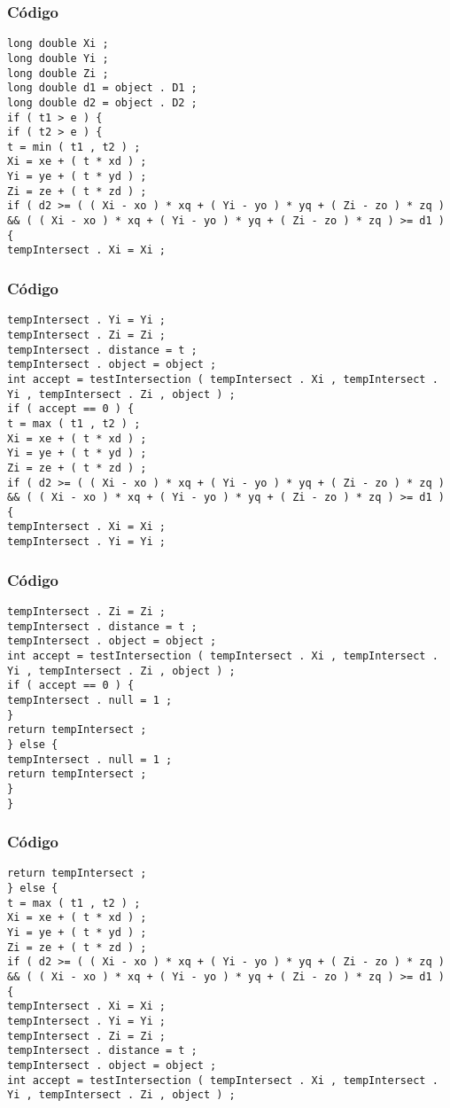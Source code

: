 \documentclass{beamer}
\begin{document}
\begin{frame}[fragile]
\frametitle{C\'odigo}
\begin{verbatim}
long double Xi ; 
long double Yi ; 
long double Zi ; 
long double d1 = object . D1 ; 
long double d2 = object . D2 ; 
if ( t1 > e ) { 
if ( t2 > e ) { 
t = min ( t1 , t2 ) ; 
Xi = xe + ( t * xd ) ; 
Yi = ye + ( t * yd ) ; 
Zi = ze + ( t * zd ) ; 
if ( d2 >= ( ( Xi - xo ) * xq + ( Yi - yo ) * yq + ( Zi - zo ) * zq ) && ( ( Xi - xo ) * xq + ( Yi - yo ) * yq + ( Zi - zo ) * zq ) >= d1 ) { 
tempIntersect . Xi = Xi ; 
\end{verbatim}
\end{frame}
\begin{frame}[fragile]
\frametitle{C\'odigo}
\begin{verbatim}
tempIntersect . Yi = Yi ; 
tempIntersect . Zi = Zi ; 
tempIntersect . distance = t ; 
tempIntersect . object = object ; 
int accept = testIntersection ( tempIntersect . Xi , tempIntersect . Yi , tempIntersect . Zi , object ) ; 
if ( accept == 0 ) { 
t = max ( t1 , t2 ) ; 
Xi = xe + ( t * xd ) ; 
Yi = ye + ( t * yd ) ; 
Zi = ze + ( t * zd ) ; 
if ( d2 >= ( ( Xi - xo ) * xq + ( Yi - yo ) * yq + ( Zi - zo ) * zq ) && ( ( Xi - xo ) * xq + ( Yi - yo ) * yq + ( Zi - zo ) * zq ) >= d1 ) { 
tempIntersect . Xi = Xi ; 
tempIntersect . Yi = Yi ; 
\end{verbatim}
\end{frame}
\begin{frame}[fragile]
\frametitle{C\'odigo}
\begin{verbatim}
tempIntersect . Zi = Zi ; 
tempIntersect . distance = t ; 
tempIntersect . object = object ; 
int accept = testIntersection ( tempIntersect . Xi , tempIntersect . Yi , tempIntersect . Zi , object ) ; 
if ( accept == 0 ) { 
tempIntersect . null = 1 ; 
} 
return tempIntersect ; 
} else { 
tempIntersect . null = 1 ; 
return tempIntersect ; 
} 
} 
\end{verbatim}
\end{frame}
\begin{frame}[fragile]
\frametitle{C\'odigo}
\begin{verbatim}
return tempIntersect ; 
} else { 
t = max ( t1 , t2 ) ; 
Xi = xe + ( t * xd ) ; 
Yi = ye + ( t * yd ) ; 
Zi = ze + ( t * zd ) ; 
if ( d2 >= ( ( Xi - xo ) * xq + ( Yi - yo ) * yq + ( Zi - zo ) * zq ) && ( ( Xi - xo ) * xq + ( Yi - yo ) * yq + ( Zi - zo ) * zq ) >= d1 ) { 
tempIntersect . Xi = Xi ; 
tempIntersect . Yi = Yi ; 
tempIntersect . Zi = Zi ; 
tempIntersect . distance = t ; 
tempIntersect . object = object ; 
int accept = testIntersection ( tempIntersect . Xi , tempIntersect . Yi , tempIntersect . Zi , object ) ; 
\end{verbatim}
\end{frame}
\end{document}
